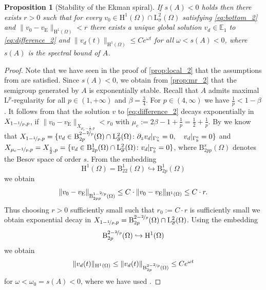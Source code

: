\documentclass[preprint]{elsarticle}
\newtheorem{prop}[prop]{Proposition}
\numberwithin{equation}{section}
\newcommand {\E}	{\mathbb{E}}
\renewcommand{\H}{\mathrm{H}}
\newcommand{\sigmabar}{\bar{\sigma}}
\newcommand{\ocn}{\mathrm{o}}
\newcommand{\Gau}{\Gamma_u^{\ocn}}
\newcommand{\Gab}{\Gamma_b^{\ocn}}
\renewcommand{\bar}[1]{\overline{#1}}
\newcommand{\rL}{\mathrm{L}}
\newcommand{\rH}{\H}
\newcommand{\rB}{\mathrm{B}}
\newcommand{\rE}{\mathrm{E}}
\begin{document}
\begin{prop}[Stability of the Ekman spiral]\label{cor:small data_2}
	If $s(A) < 0$ holds
	then there exists $r > 0$ such that for every $v_0 \in \rH^{1}(\Omega) \cap \rL^2_{\sigmabar}(\Omega)$ satisfying \eqref{eq:bottom_2}
	and $\| v_0-v_{\rE} \|_{\rH^1(\Omega)} < r$ there exists 
	a unique global solution $v_d \in \E_1$ to \eqref{eq:difference_2} and $\| v_d(t) \|_{\rH^1(\Omega)} \leq C e^{\omega t}$ for all $\omega < s(A) < 0$, where $s(A)$ is the spectral bound of $A$.  
\end{prop}
\begin{proof}
	Note that we have seen in the proof of \autoref{prop:local_2} that the assumptions from \cite{PWS:18_2} are satisfied.
	Since $s(A) < 0$, we obtain from \autoref{prop:mr_2} that the semigroup generated by $A$ is exponentially stable.  
	Recall that $A$ admits maximal $\rL^p$-regularity for all $p \in (1,+\infty)$ and $\beta = \frac{3}{4}$.
	For $p \in (4,\infty)$ we have $\frac{1}{p} < 1-\beta$. 
	It follows from \cite[Corollary 2.2]{PWS:18_2} that the solution $v$ to \eqref{eq:difference_2} decays exponentially in $X_{1-\nicefrac{1}{p},p}$,
	if $\| v_0 - v_{\rE} \|_{X_{\mu_c-\frac{1}{p},p}} < r_0$ with $\mu_c := 2 \beta - 1+\frac{1}{p} = \frac{1}{2}+ \frac{1}{p}$.
	By \cite[Lemma 2.1]{GGHHK:20_2} we know that
	$X_{1-\nicefrac{1}{p},p} = \{ v_d \in \rB^{2-\nicefrac{2}{p}}_{2p}(\Omega) \cap \rL^2_{\sigmabar}(\Omega) \colon \partial_z v_d|_{\Gau} = 0, \quad v_d|_{\Gab} = 0 \}$
	and 
	$X_{\mu_c-\nicefrac{1}{p},p} =
	X_{\frac{1}{2},p}
	= \{ v_d \in \rB^{1}_{2p}(\Omega) \cap \rL^2_{\sigmabar}(\Omega)\colon v_d|_{\Gab} = 0 \}$, where $\rB^{s}_{2pp}(\Omega)$ denotes the Besov space of order $s$.
	From the embedding 
	\begin{equation*}
		\rH^1(\Omega)
		= \rB^1_{22}(\Omega)
		\hookrightarrow \rB^{1}_{2p}(\Omega)
	\end{equation*}
	we obtain
	\begin{equation*}
		\| v_0 - v_{\rE} \|_{\rB^{1-\nicefrac{2}{p}}_{2pp}(\Omega)}
		\leq 
		C \cdot 
		\| v_0 - v_{\rE} \|_{\rH^1(\Omega)}
		\leq C \cdot r .
	\end{equation*}
	Thus choosing $r>0$ sufficiently small such that $r_0 := C \cdot r$ is sufficiently small we obtain exponential decay in 	$X_{1-\nicefrac{1}{p},p} = \rB^{2-\nicefrac{2}{p}}_{2p}(\Omega) \cap \rL^2_{\sigmabar}(\Omega)$.
	Using the embedding 
	\begin{equation*}
		\rB^{2-\nicefrac{2}{p}}_{2p}(\Omega) \hookrightarrow \rH^{1}(\Omega)
	\end{equation*}
	we obtain 
	\begin{equation*} 
		\| v_d(t) \|_{\rH^1(\Omega)}
		\leq \| v_d(t) \|_{\rB^{2-\nicefrac{2}{p}}_{2p}(\Omega)} \leq C e^{\omega t}
	\end{equation*}
	for $\omega < \omega_0 = s(A) < 0$, where we have used \cite[Corollary IV.3.12]{EN:00_2}.
\end{proof}
\end{document}
